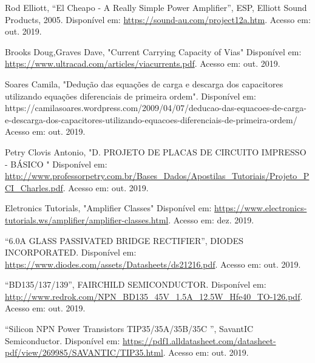\documentclass[a4paper,12pt,oneside,openany,table,xcdraw]{article}
\begin{document}
\newpage
\begin{thebibliography}{9} 
    Rod Elliott,
    “El Cheapo - A Really Simple Power Amplifier”, ESP, Elliott Sound Products, 2005.
 Disponível em:
 \url{https://sound-au.com/project12a.htm}. Acesso em: out. 2019.
 
 
    Brooks Doug,Graves Dave,
    "Current Carrying Capacity of Vias"
 Disponível em: 
 \url{https://www.ultracad.com/articles/viacurrents.pdf}. Acesso em: out. 2019.
 
    Soares Camila,
 "Dedução das equações de carga e descarga dos capacitores utilizando equações diferenciais de primeira ordem". 
  Disponível em: 
https://camilasoares.wordpress.com/2009/04/07/deducao-das-equacoes-de-carga-e-descarga-dos-capacitores-utilizando-equacoes-diferenciais-de-primeira-ordem/ 
Acesso em: out. 2019.
 
    Petry Clovis Antonio,
 "D. PROJETO DE PLACAS DE CIRCUITO
IMPRESSO - BÁSICO "
  Disponível em: 
 \url{http://www.professorpetry.com.br/Bases_Dados/Apostilas_Tutoriais/Projeto_PCI_Charles.pdf}. Acesso em: out. 2019.
 
    Eletronics Tutorials,
 "Amplifier Classes"
  Disponível em: 
 \url{https://www.electronics-tutorials.ws/amplifier/amplifier-classes.html}. Acesso em: dez. 2019.
 
 
        “6.0A GLASS PASSIVATED BRIDGE RECTIFIER”, DIODES INCORPORATED.
 Disponível em:
 \url{https://www.diodes.com/assets/Datasheets/ds21216.pdf}. Acesso em: out. 2019.
 
    “BD135/137/139”, FAIRCHILD SEMICONDUCTOR.
 Disponível em:
 \url{http://www.redrok.com/NPN_BD135_45V_1.5A_12.5W_Hfe40_TO-126.pdf}. Acesso em: out. 2019.
 
    “Silicon NPN Power Transistors TIP35/35A/35B/35C ”, SavantIC Semiconductor. 
 Disponível em:
 \url{https://pdf1.alldatasheet.com/datasheet-pdf/view/269985/SAVANTIC/TIP35.html}. Acesso em: out. 2019.

\end{thebibliography}
\end{document}
